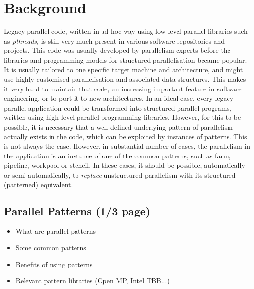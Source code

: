 \section{Background}
Legacy-parallel code, written in ad-hoc way using low level parallel libraries such as \emph{pthreads}, is still very much present in various software repositories and projects. This code was usually developed by parallelism experts before the libraries and programming models for structured parallelisation became popular. It is usually tailored to one specific target machine and architecture, and might use highly-customised parallelisation and associated data structures. This makes it very hard to maintain that code, an increasing important feature in software engineering, or to port it to new architectures. In an ideal case, every legacy-parallel application could be transformed into structured parallel programs, written using high-level parallel programming libraries. However, for this to be possible, it is necessary that a well-defined underlying pattern of parallelism actually exists in the code, which can be exploited by instances of patterns. This is not always the case. However, in substantial number of cases, the parallelism in the application is an instance of one of the common patterns, such as farm, pipeline, workpool or stencil. In these cases, it should be possible, automatically or semi-automatically, to \emph{replace} unstructured parallelism with its structured (patterned) equivalent.   

\subsection{Parallel Patterns (1/3 page)}
\begin{itemize}
\item What are parallel patterns
\item Some common patterns
  \item Benefits of using patterns
  \item Relevant pattern libraries (Open MP, Intel TBB...)
\end{itemize}

